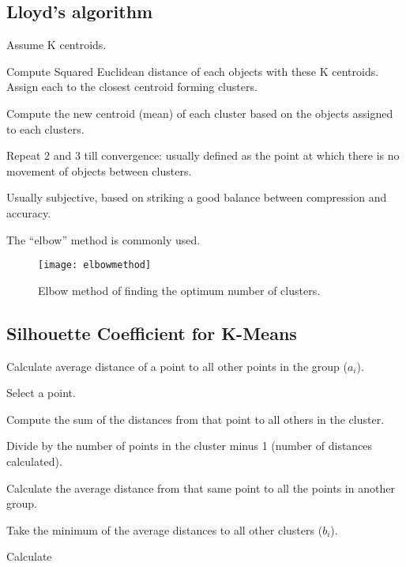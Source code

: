 	\subsection{Lloyd's algorithm}

	\begin{numberedlist}
		\item Assume K centroids.
		\item Compute Squared Euclidean distance of each objects with these K centroids. Assign each to the closest centroid forming clusters.
		\item Compute the new centroid (mean) of each cluster based on the objects assigned to each clusters.
		\item Repeat 2 and 3 till convergence: usually defined as the point at which there is no movement of objects between clusters.
	\end{numberedlist}

	\begin{bulletedlist}
		\item Usually subjective, based on striking a good balance between compression and accuracy.
		\item The ``elbow'' method is commonly used.
	\end{bulletedlist}

	\begin{figure}[h]
		\centering
		\texttt{[image: elbowmethod]}
		\caption[Elbow method of finding the optimum number of clusters]{Elbow method of finding the optimum number of clusters.}
		\label{fig:elbowmethod}
	\end{figure}

	\subsection{Silhouette Coefficient for K-Means}
	\begin{numberedlist}
		\item Calculate average distance of a point to all other points in the group ($a_i$).
			\begin{numberedlist}
				\item Select a point.
				\item Compute the sum of the distances from that point to all others in the cluster.
				\item Divide by the number of points in the cluster minus 1 (number of distances calculated).
			\end{numberedlist}
		\item Calculate the average distance from that same point to all the points in another group.
		\item Take the minimum of the average distances to all other clusters ($b_i$).
		\item Calculate
	\end{numberedlist}

